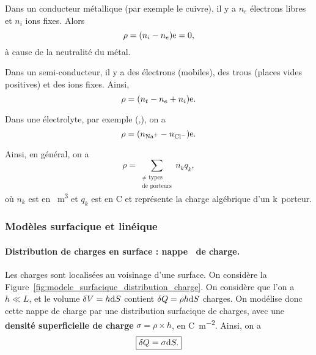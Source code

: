             \begin{example}
                Dans un conducteur métallique (par exemple le cuivre), il y a $n_e$ électrons libres et $n_i$ ions fixes. Alors 
                \begin{equation}
                    \rho=(n_i-n_e)\mathrm{e}=0,
                \end{equation}
                à cause de la neutralité du métal.
            \end{example}
            \begin{example}
                Dans un semi-conducteur, il y a des électrons (mobiles), des trous (places vides positives) et des ions fixes. Ainsi,
                \begin{equation}
                    \rho=(n_t-n_e+n_i)\mathrm{e}.
                \end{equation}
            \end{example}
            \begin{example}
                Dans une électrolyte, par exemple (,), on a 
                \begin{equation}
                    \rho=(n_{\ce{Na+}}-n_{\ce{Cl-}})\e.
                \end{equation}
            \end{example}

            Ainsi, en général, on a
            \begin{equation}
                \rho=\sum_{\substack{\neq\text{ types}\\\text{de porteurs}}}n_{k}q_{k},
            \end{equation}
            où $n_k$ est en \si{\per\metre\cubed} et $q_k$ est en \si{\coulomb} et représente la charge algébrique d'un \og k\fg~porteur.

        \subsubsection{Modèles surfacique et linéique}

            \paragraph{Distribution de charges en surface : \og nappe\fg~ de charge.}

                Les charges sont localisées au voisinage d'une surface. On considère la Figure~\ref{fig:modele_surfacique_distribution_charge}. On considère que l'on a $h\ll L$, et le volume $\delta V=h\mathrm{d} S$ contient $\delta Q=\rho h\mathrm{d} S$ charges. On modélise donc cette nappe de charge par une distribution surfacique de charges, avec une \textbf{densité superficielle de charge} $\sigma=\rho\times h$, en \si{\coulomb\per\metre\squared}. Ainsi, on a 
                \begin{equation}
                    \boxed{
                        \delta Q=\sigma\mathrm{d} S.
                    }
                \end{equation}

